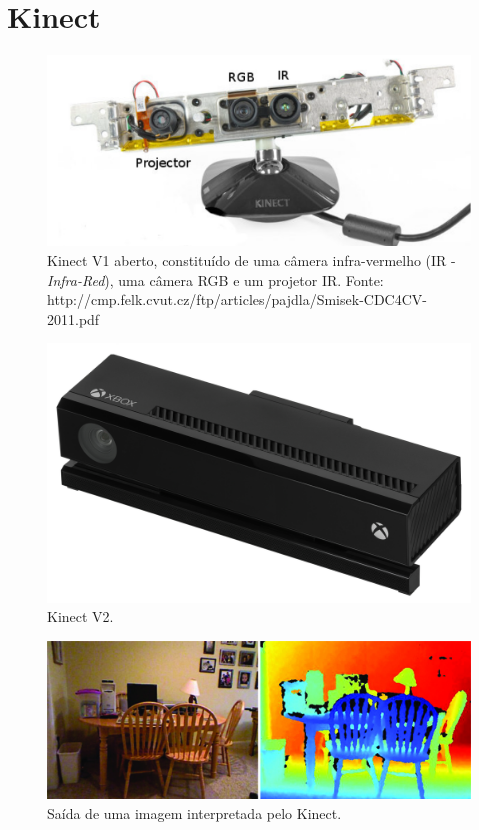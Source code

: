 \documentclass[table, usenames, svgnames, xcolor=dvipsnames]{beamer}
\begin{document}
\section{Kinect}
%

\begin{frame}
	\begin{figure}
		\centering
		\includegraphics[width=0.5\linewidth]{figs/kinect.png}
		\caption{%
 		 Kinect V1 aberto, constituído de uma câmera infra-vermelho (IR -
 		 \protect\emph{Infra-Red}), uma câmera RGB e um projetor IR.
 		 \tiny{Fonte: http://cmp.felk.cvut.cz/ftp/articles/pajdla/Smisek-CDC4CV-2011.pdf}
		}
	\end{figure}
\end{frame}

\begin{frame}
	\begin{figure}
		\centering
		\includegraphics[width=0.5\linewidth]{figs/Xbox-One-Kinect.jpg}
		\caption{%
 		 Kinect V2.
		}
	\end{figure}
\end{frame}

\begin{frame}
	\begin{figure}
		\centering
		\includegraphics[width=1\linewidth]{figs/profundidadekinect.png}
		\caption{%
 			 Saída de uma imagem interpretada pelo Kinect.
		}
	\end{figure}
\end{frame}
\end{document}

